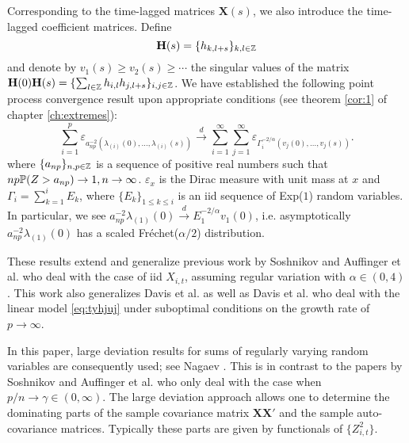 Corresponding to the time-lagged matrices $\mathbf X(s)$, we also introduce
the time-lagged coefficient matrices. Define
\[
\mathbf H(s) = \{h_{k, l+s}\}_{k, l \in \integers}
\]
and denote by $v_1(s) \geq v_2(s) \geq \cdots$ the singular values of
the matrix
$\mathbf H(0) \mathbf H(s) = \{\sum_{l \in \integers} h_{i,l} h_{j,l+s}\}_{i,j \in \integers}$.
We have established the following point process convergence result
upon appropriate conditions (see theorem \ref{cor:1} of chapter
\ref{ch:extremes}):
\[
\sum_{i=1}^p \varepsilon_{a_{np}^{-2}(\lambda_{(i)}(0), \ldots, \lambda_{(i)}(s))}
\overset{d}{\to}
\sum_{i=1}^\infty \sum_{j=1}^\infty
\varepsilon_{\Gamma_i^{-2/\alpha}(v_j(0), \ldots, v_j(s))}.
\]
where $\{a_{np}\}_{n,p \in \integers}$ is a sequence of positive real
numbers such that $n p \P(Z > a_{np}) \to 1, n \to \infty$.
$\varepsilon_{x}$ is the Dirac measure with unit mass at $x$ and
$\Gamma_i = \sum_{k=1}^i E_k$, where $\{E_k\}_{1 \leq k \leq i}$ is
an iid sequence of Exp($1$) random variables. In particular, we see
$a_{np}^{-2}\lambda_{(1)}(0) \overset{d}{\to} E_1^{-2/\alpha} v_1(0)$, i.e.
asymptotically $a_{np}^{-2}\lambda_{(1)}(0)$ has a scaled
Fréchet($\alpha/2$) distribution.

These results extend and generalize previous work by Soshnikov
\cite{soshnikov:2004} and Auffinger et
al. \cite{auffinger:arous:peche:2009} who deal with the case of iid
$X_{i,t}$, assuming regular variation with $\alpha \in (0, 4)$. This
work also generalizes Davis et al. \cite{davis:pfaffel:stelzer:2014}
as well as Davis et al. \cite{davis:mikosch:pfaffel:2016} who deal with
the linear model \eqref{eq:tyhjuj} under suboptimal conditions on the
growth rate of $p \to \infty$.

In this paper, large deviation results for sums of regularly varying
random variables are consequently used; see Nagaev
\cite{nagaev:1979}. This is in contrast to the papers by Soshnikov
\cite{soshnikov:2004}  and Auffinger et
al. \cite{auffinger:arous:peche:2009} who only deal with the case when
$p/n \to \gamma \in (0, \infty)$. The large deviation approach allows
one to determine the dominating parts of the sample covariance matrix
$\mathbf {XX'}$ and the sample auto-covariance matrices. Typically
these parts are given by functionals of $\{Z_{i,t}^2\}$.

